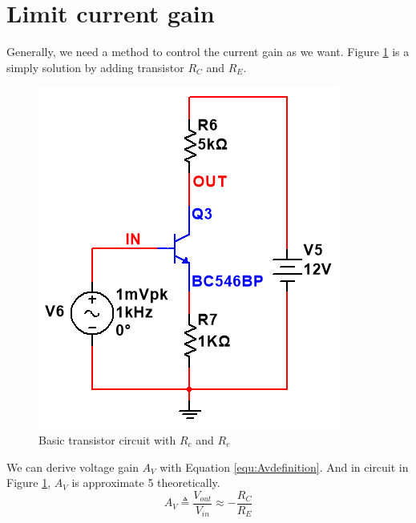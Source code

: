 
\section{Limit current gain} 
Generally, we need a method to control the current gain as we want. Figure \ref{fig:basictransistorcircuitwithRcandRe} is a simply solution by adding transistor $R_C$ and $R_E$.

\begin{figure}[htbp]
\centering
\includegraphics[scale=0.7]{"../Photo/Chap1/basic transistor circuit with Rc and Re"}
\caption{Basic transistor circuit with $R_c$ and $R_e$}
\label{fig:basictransistorcircuitwithRcandRe}
\end{figure}

We can derive voltage gain $A_V$ with Equation \ref{equ:Avdefinition}. And in circuit in Figure \ref{fig:basictransistorcircuitwithRcandRe}, $A_V$ is approximate 5 theoretically.
\begin{equation}
A_V \triangleq \frac{ V_{out}} { V_{in}} \approx -\frac{R_C}{R_E}
\label{equ:Avdefinition}
\end{equation}



